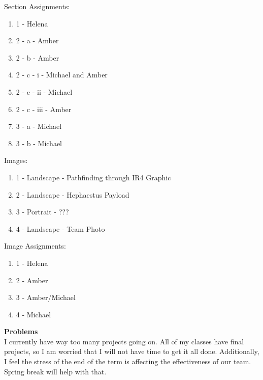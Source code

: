 Section Assignments: \\
\begin{enumerate}
\item{1 - Helena}
\item{2 - a - Amber}
\item{2 - b - Amber}
\item{2 - c - i - Michael and Amber}
\item{2 - c - ii - Michael}
\item{2 - c - iii - Amber}
\item{3 - a - Michael}
\item{3 - b - Michael}
\end{enumerate}

Images: \\ 
\begin{enumerate}
\item{1 - Landscape - Pathfinding through IR4 Graphic}
\item{2 - Landscape - Hephaestus Payload}
\item{3 - Portrait - ???}
\item{4 - Landscape - Team Photo}
\end{enumerate}

Image Assignments: \\ 
\begin{enumerate}
\item{1 - Helena}
\item{2 - Amber}
\item{3 - Amber/Michael}
\item{4 - Michael}
\end{enumerate}

\textbf{Problems} \\ 
I currently have way too many projects going on. All of my classes have final projects, so I am worried that I will not have time to get it all done. Additionally, I feel the stress of the end of the term is affecting the effectiveness of our team. Spring break will help with that.

